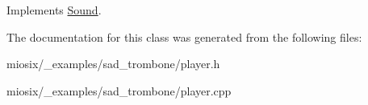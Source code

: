 Implements \hyperlink{class_sound_a1870e3d50f0f58fc98fd966372ce42f1}{Sound}.



The documentation for this class was generated from the following files\-:\begin{DoxyCompactItemize}
\item 
miosix/\-\_\-examples/sad\-\_\-trombone/player.\-h\item 
miosix/\-\_\-examples/sad\-\_\-trombone/player.\-cpp\end{DoxyCompactItemize}

